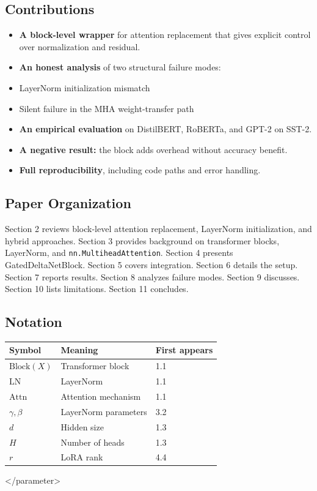 \subsection{Contributions}

\begin{itemize}
\item \textbf{A block-level wrapper} for attention replacement that gives explicit
  control over normalization and residual.
\item \textbf{An honest analysis} of two structural failure modes:
\item LayerNorm initialization mismatch
\item Silent failure in the MHA weight-transfer path
\item \textbf{An empirical evaluation} on DistilBERT, RoBERTa, and GPT-2 on SST-2.
\item \textbf{A negative result:} the block adds overhead without accuracy benefit.
\item \textbf{Full reproducibility}, including code paths and error handling.

\end{itemize}
\subsection{Paper Organization}

Section 2 reviews block-level attention replacement, LayerNorm 
initialization, and hybrid approaches. Section 3 provides background on 
transformer blocks, LayerNorm, and \texttt{nn.MultiheadAttention}. Section 4 
presents GatedDeltaNetBlock. Section 5 covers integration. Section 6 
details the setup. Section 7 reports results. Section 8 analyzes failure 
modes. Section 9 discusses. Section 10 lists limitations. Section 11 
concludes.



\subsection{Notation}

\begin{table}[H]
\centering
\small
\begin{tabular}{lll}
\toprule
\textbf{Symbol} & \textbf{Meaning} & \textbf{First appears} \\
\midrule
$\text{Block}(X)$ & Transformer block & 1.1 \\
$\text{LN}$ & LayerNorm & 1.1 \\
$\text{Attn}$ & Attention mechanism & 1.1 \\
$\gamma, \beta$ & LayerNorm parameters & 3.2 \\
$d$ & Hidden size & 1.3 \\
$H$ & Number of heads & 1.3 \\
$r$ & LoRA rank & 4.4 \\
\bottomrule
\end{tabular}
\end{table}
\textless{}/parameter\textgreater{}

